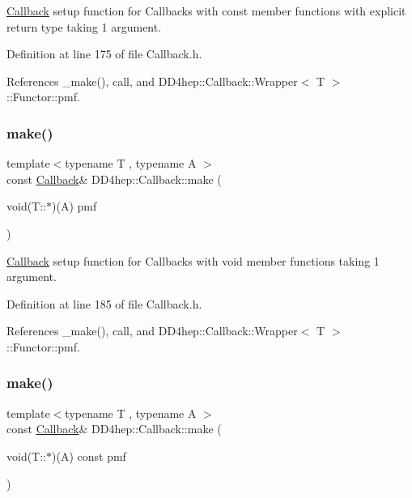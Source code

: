 \hyperlink{class_d_d4hep_1_1_callback}{Callback} setup function for Callbacks with const member functions with explicit return type taking 1 argument. 



Definition at line 175 of file Callback.\+h.



References \+\_\+make(), call, and D\+D4hep\+::\+Callback\+::\+Wrapper$<$ T $>$\+::\+Functor\+::pmf.

\hypertarget{class_d_d4hep_1_1_callback_a2b3daea36eaa426e35e594741c706e4d}{}\label{class_d_d4hep_1_1_callback_a2b3daea36eaa426e35e594741c706e4d} 
\subsubsection{\texorpdfstring{make()}{make()}\hspace{0.1cm}{\footnotesize\ttfamily [7/17]}}
{\footnotesize\ttfamily template$<$typename T , typename A $>$ \\
const \hyperlink{class_d_d4hep_1_1_callback}{Callback}\& D\+D4hep\+::\+Callback\+::make (\begin{DoxyParamCaption}\item[{void(T\+::$\ast$)(A)}]{pmf }\end{DoxyParamCaption})\hspace{0.3cm}{\ttfamily [inline]}}



\hyperlink{class_d_d4hep_1_1_callback}{Callback} setup function for Callbacks with void member functions taking 1 argument. 



Definition at line 185 of file Callback.\+h.



References \+\_\+make(), call, and D\+D4hep\+::\+Callback\+::\+Wrapper$<$ T $>$\+::\+Functor\+::pmf.

\hypertarget{class_d_d4hep_1_1_callback_a54e0c87cbab3d6ab42e44a16bd35a538}{}\label{class_d_d4hep_1_1_callback_a54e0c87cbab3d6ab42e44a16bd35a538} 
\subsubsection{\texorpdfstring{make()}{make()}\hspace{0.1cm}{\footnotesize\ttfamily [8/17]}}
{\footnotesize\ttfamily template$<$typename T , typename A $>$ \\
const \hyperlink{class_d_d4hep_1_1_callback}{Callback}\& D\+D4hep\+::\+Callback\+::make (\begin{DoxyParamCaption}\item[{void(T\+::$\ast$)(A) const}]{pmf }\end{DoxyParamCaption})\hspace{0.3cm}{\ttfamily [inline]}}



